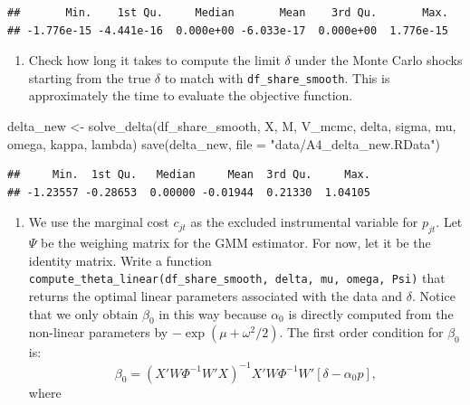 \documentclass[
]{book}
\newenvironment{Shaded}{\begin{snugshade}}{\end{snugshade}}
\newcommand{\AttributeTok}[1]{\textcolor[rgb]{0.77,0.63,0.00}{#1}}
\newcommand{\FunctionTok}[1]{\textcolor[rgb]{0.00,0.00,0.00}{#1}}
\newcommand{\NormalTok}[1]{#1}
\newcommand{\OtherTok}[1]{\textcolor[rgb]{0.56,0.35,0.01}{#1}}
\newcommand{\SpecialCharTok}[1]{\textcolor[rgb]{0.00,0.00,0.00}{#1}}
\newcommand{\StringTok}[1]{\textcolor[rgb]{0.31,0.60,0.02}{#1}}
\providecommand{\tightlist}{%
  \setlength{\itemsep}{0pt}\setlength{\parskip}{0pt}}
\begin{document}
\begin{verbatim}
##       Min.    1st Qu.     Median       Mean    3rd Qu.       Max. 
## -1.776e-15 -4.441e-16  0.000e+00 -6.033e-17  0.000e+00  1.776e-15
\end{verbatim}

\begin{enumerate}
\def\labelenumi{\arabic{enumi}.}
\setcounter{enumi}{8}
\tightlist
\item
  Check how long it takes to compute the limit \(\delta\) under the Monte Carlo shocks starting from the true \(\delta\) to match with \texttt{df\_share\_smooth}. This is approximately the time to evaluate the objective function.
\end{enumerate}

\begin{Shaded}
\begin{Highlighting}[]
\NormalTok{delta\_new }\OtherTok{\textless{}{-}}
  \FunctionTok{solve\_delta}\NormalTok{(df\_share\_smooth, X, M, V\_mcmc, delta, sigma, mu, omega, kappa, lambda)}
\FunctionTok{save}\NormalTok{(delta\_new, }\AttributeTok{file =} \StringTok{"data/A4\_delta\_new.RData"}\NormalTok{)}
\end{Highlighting}
\end{Shaded}

\begin{Shaded}
\end{Shaded}

\begin{verbatim}
##     Min.  1st Qu.   Median     Mean  3rd Qu.     Max. 
## -1.23557 -0.28653  0.00000 -0.01944  0.21330  1.04105
\end{verbatim}

\begin{enumerate}
\def\labelenumi{\arabic{enumi}.}
\setcounter{enumi}{9}
\tightlist
\item
  We use the marginal cost \(c_{jt}\) as the excluded instrumental variable for \(p_{jt}\). Let \(\Psi\) be the weighing matrix for the GMM estimator. For now, let it be the identity matrix. Write a function \texttt{compute\_theta\_linear(df\_share\_smooth,\ delta,\ mu,\ omega,\ Psi)} that returns the optimal linear parameters associated with the data and \(\delta\). Notice that we only obtain \(\beta_0\) in this way because \(\alpha_0\) is directly computed from the non-linear parameters by \(-\exp(\mu + \omega^2/2)\). The first order condition for \(\beta_0\) is:
  \begin{equation}
  \beta_0 = (X'W \Phi^{-1} W'X)^{-1} X' W \Phi^{-1} W' [\delta - \alpha_0 p],
  \end{equation}
  where
\end{enumerate}
\end{document}
